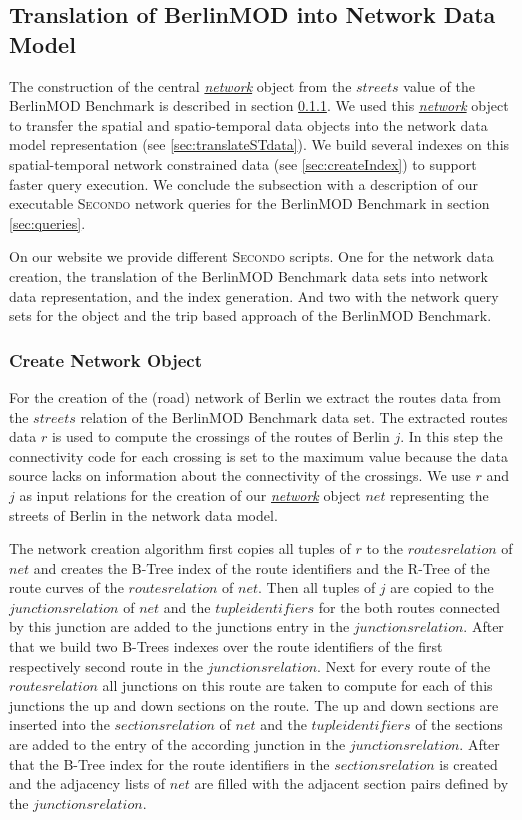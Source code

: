 \documentclass[a4paper]{article}
\newcommand{\secondo}{\textsc{Secondo}}
\newcommand{\bmodb} {BerlinMOD Benchmark}
\newcommand{\dt}[1]{\textsl{\underline{#1}}}
\begin{document}
{\subsection{Translation of BerlinMOD into Network Data Model}
\label{sec:Translation}
The construction of the central \dt{network} object from the $streets$ value
of the \bmodb{} is described in section \ref{sec:createNetwork}. We used this
\dt{network} object to transfer the spatial and spatio-temporal data objects into
the network data model representation (see \ref{sec:translateSTdata}). We build
several indexes on this spatial-temporal network constrained data (see
\ref{sec:createIndex}) to support faster query execution. We conclude the subsection
with a description of our executable \secondo{} network queries for the \bmodb{}
in section \ref{sec:queries}.

On our website \cite{berlinmodweb} we provide different \secondo{} scripts. One
for the network data creation, the translation of the \bmodb{} data sets into
network data representation, and the index generation. And two with the network
query sets for the object and the trip based approach of the \bmodb{}.
\subsubsection{Create Network Object}
\label{sec:createNetwork}
For the creation of the (road) network of Berlin we extract the routes
 data from the $streets$ relation of the \bmodb{} data set. The extracted
routes data $r$ is used to compute the crossings of the routes of Berlin $j$.
In this step the connectivity code for each crossing is set to the maximum value
 because the data source lacks on information about the connectivity of the crossings.
We use $r$ and $j$ as input relations for the creation of our \dt{network}
object $net$ representing the streets of Berlin in the network data model.

The network creation algorithm first copies all tuples of $r$ to the
$routes relation$ of $net$ and creates the B-Tree index of the route
identifiers and the R-Tree of the route curves of the $routes relation$ of
$net$. Then all tuples of $j$ are copied to the $junctions relation$
of $net$ and the $tuple identifiers$ for the both routes connected
by this junction are added to the junctions entry in the $junctions relation$.
After that we build two B-Trees indexes over the route identifiers of the first
respectively second route in the $junctions relation$. Next for every route of the
$routes relation$ all junctions on this route are taken to compute
for each of this junctions the up and down sections on the route. The up and down
sections are inserted into the $sections relation$ of $net$ and the
$tuple identifiers$ of the sections are added to the entry of the according
junction in the $junctions relation$. After that the B-Tree index for the
 route identifiers in the $sections relation$ is created and the adjacency
lists of $net$ are filled with the adjacent section pairs defined by the
$junctions relation$.

}
\end{document}
